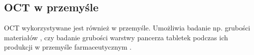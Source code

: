 \subsection{OCT w przemyśle}

OCT wykorzystywane jest również w przemyśle. Umożliwia badanie np. grubości materiałów \cite{walecki2006determining}, czy badanie grubości warstwy pancerza tabletek podczas ich produkcji w przemyśle farmaceutycznym \cite{markl2014device}.
